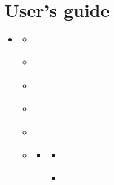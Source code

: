 \documentclass[letterpaper,10pt,english]{sphinxmanual}
\begin{document}
\chapter{User’s guide}
\label{\detokenize{guide:user-s-guide}}\label{\detokenize{guide:ug}}\label{\detokenize{guide::doc}}
\begin{sphinxShadowBox}
\begin{itemize}
\item {} 
\label{\detokenize{guide:id2}}{\hyperref[\detokenize{guide:user-s-guide}]{}}
\begin{itemize}
\item {} 
\label{\detokenize{guide:id3}}{\hyperref[\detokenize{guide:introduction}]{}}

\item {} 
\label{\detokenize{guide:id4}}{\hyperref[\detokenize{guide:installation}]{}}

\item {} 
\label{\detokenize{guide:id5}}{\hyperref[\detokenize{guide:playbook}]{}}

\item {} 
\label{\detokenize{guide:id6}}{\hyperref[\detokenize{guide:debug}]{}}

\item {} 
\label{\detokenize{guide:id7}}{\hyperref[\detokenize{guide:tags}]{}}

\item {} 
\label{\detokenize{guide:id8}}{\hyperref[\detokenize{guide:tasks}]{}}
\begin{itemize}
\item {} 
\label{\detokenize{guide:id9}}{\hyperref[\detokenize{guide:passwords}]{}}
\begin{itemize}
\item {} 
\label{\detokenize{guide:id10}}{\hyperref[\detokenize{guide:synopsis}]{}}

\item {} 
\label{\detokenize{guide:id11}}{\hyperref[\detokenize{guide:index-0}]{}}

\end{itemize}


\end{itemize}
\end{itemize}
\end{itemize}
\end{sphinxShadowBox}
\end{document}
